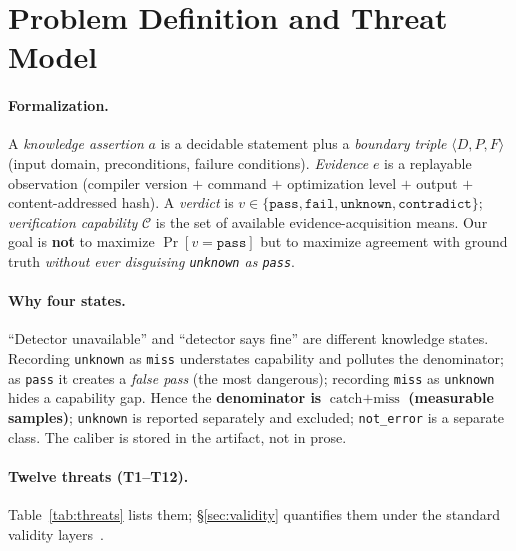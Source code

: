 \documentclass{article}
\begin{document}
\section{Problem Definition and Threat Model}
\label{sec:threat}
\paragraph{Formalization.}
A \emph{knowledge assertion} $a$ is a decidable statement plus a \emph{boundary triple}
$\langle D, P, F\rangle$ (input domain, preconditions, failure conditions). \emph{Evidence} $e$ is
a replayable observation (compiler version $+$ command $+$ optimization level $+$ output $+$
content-addressed hash). A \emph{verdict} is $v\in\{\texttt{pass},\texttt{fail},\texttt{unknown},
\texttt{contradict}\}$; \emph{verification capability} $\mathcal{C}$ is the set of available
evidence-acquisition means. Our goal is \textbf{not} to maximize $\Pr[v{=}\texttt{pass}]$ but to
maximize agreement with ground truth \emph{without ever disguising \texttt{unknown} as \texttt{pass}}.

\paragraph{Why four states.} ``Detector unavailable'' and ``detector says fine'' are different
knowledge states. Recording \texttt{unknown} as \texttt{miss} understates capability and pollutes
the denominator; as \texttt{pass} it creates a \emph{false pass} (the most dangerous); recording
\texttt{miss} as \texttt{unknown} hides a capability gap. Hence the \textbf{denominator is
$\text{catch}+\text{miss}$ (measurable samples)}; \texttt{unknown} is reported separately and
excluded; \texttt{not\_error} is a separate class. The caliber is stored in the artifact, not in
prose.

\paragraph{Twelve threats (T1--T12).}
Table~\ref{tab:threats} lists them; \S\ref{sec:validity} quantifies them under the standard
validity layers~\cite{shadish2002experimental}.
\end{document}
